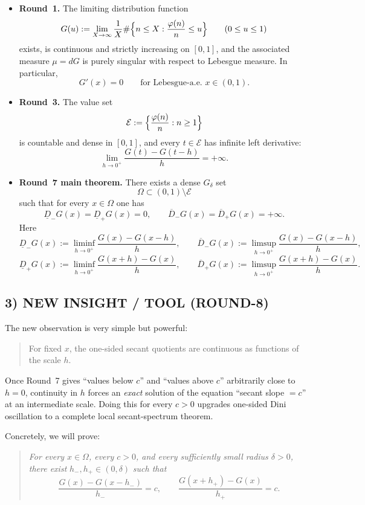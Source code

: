 \begin{itemize}
\item \textbf{Round~1.} The limiting distribution function
\[
G(u):=\lim_{X\to\infty}\frac1X\#\Bigl\{n\le X:\frac{\varphi(n)}n\le u\Bigr\}
\qquad(0\le u\le 1)
\]
exists, is continuous and strictly increasing on $[0,1]$, and the associated measure $\mu=dG$ is purely singular with respect to Lebesgue measure. In particular,
\[
G'(x)=0\qquad\text{for Lebesgue-a.e. }x\in(0,1).
\]

\item \textbf{Round~3.} The value set
\[
\mathcal E:=\Bigl\{\frac{\varphi(n)}{n}:n\ge 1\Bigr\}
\]
is countable and dense in $[0,1]$, and every $t\in\mathcal E$ has infinite left derivative:
\[
\lim_{h\to 0^+}\frac{G(t)-G(t-h)}{h}=+\infty.
\]

\item \textbf{Round~7 main theorem.} There exists a dense $G_\delta$ set
\[
\Omega\subset (0,1)\setminus\mathcal E
\]
such that for every $x\in\Omega$ one has
\[
\underline D_-G(x)=\underline D_+G(x)=0,
\qquad
\overline D_-G(x)=\overline D_+G(x)=+\infty.
\]
Here
\[
\underline D_-G(x):=\liminf_{h\to0^+}\frac{G(x)-G(x-h)}{h},
\qquad
\overline D_-G(x):=\limsup_{h\to0^+}\frac{G(x)-G(x-h)}{h},
\]
\[
\underline D_+G(x):=\liminf_{h\to0^+}\frac{G(x+h)-G(x)}{h},
\qquad
\overline D_+G(x):=\limsup_{h\to0^+}\frac{G(x+h)-G(x)}{h}.
\]
\end{itemize}

\subsection{3) NEW INSIGHT / TOOL (ROUND-8)}

The new observation is very simple but powerful:

\begin{quote}
For fixed $x$, the one-sided secant quotients are continuous as functions of the scale $h$.
\end{quote}

Once Round~7 gives ``values below $c$'' and ``values above $c$'' arbitrarily close to $h=0$, continuity in $h$ forces an \emph{exact} solution of the equation ``secant slope $=c$'' at an intermediate scale. Doing this for every $c>0$ upgrades one-sided Dini oscillation to a complete local secant-spectrum theorem.

Concretely, we will prove:

\begin{quote}
\emph{For every $x\in\Omega$, every $c>0$, and every sufficiently small radius $\delta>0$, there exist }$h_-,h_+\in(0,\delta)$ \emph{such that}
\[
\frac{G(x)-G(x-h_-)}{h_-}=c,
\qquad
\frac{G(x+h_+)-G(x)}{h_+}=c.
\]
\end{quote}

